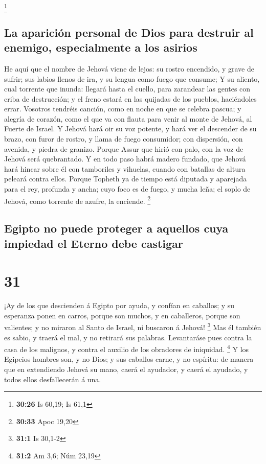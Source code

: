 \footnote{\textbf{30:26} Is 60,19; Is 61,1}

\hypertarget{la-apariciuxf3n-personal-de-dios-para-destruir-al-enemigo-especialmente-a-los-asirios}{%
\subsection{La aparición personal de Dios para destruir al enemigo,
especialmente a los
asirios}\label{la-apariciuxf3n-personal-de-dios-para-destruir-al-enemigo-especialmente-a-los-asirios}}

 He aquí que el nombre de Jehová viene de lejos: su
rostro encendido, y grave de sufrir; sus labios llenos de ira, y su
lengua como fuego que consume;  Y su aliento, cual
torrente que inunda: llegará hasta el cuello, para zarandear las gentes
con criba de destrucción; y el freno estará en las quijadas de los
pueblos, haciéndoles errar.  Vosotros tendréis canción,
como en noche en que se celebra pascua; y alegría de corazón, como el
que va con flauta para venir al monte de Jehová, al Fuerte de Israel.
 Y Jehová hará oir su voz potente, y hará ver el
descender de su brazo, con furor de rostro, y llama de fuego consumidor;
con dispersión, con avenida, y piedra de granizo.  Porque
Assur que hirió con palo, con la voz de Jehová será quebrantado.
 Y en todo paso habrá madero fundado, que Jehová hará
hincar sobre él con tamboriles y vihuelas, cuando con batallas de altura
peleará contra ellos.  Porque Topheth ya de tiempo está
diputada y aparejada para el rey, profunda y ancha; cuyo foco es de
fuego, y mucha leña; el soplo de Jehová, como torrente de azufre, la
enciende. \footnote{\textbf{30:33} Apoc 19,20}

\hypertarget{egipto-no-puede-proteger-a-aquellos-cuya-impiedad-el-eterno-debe-castigar}{%
\subsection{Egipto no puede proteger a aquellos cuya impiedad el Eterno
debe
castigar}\label{egipto-no-puede-proteger-a-aquellos-cuya-impiedad-el-eterno-debe-castigar}}

\hypertarget{section-30}{%
\section{31}\label{section-30}}

 ¡Ay de los que descienden á Egipto por ayuda, y confían
en caballos; y su esperanza ponen en carros, porque son muchos, y en
caballeros, porque son valientes; y no miraron al Santo de Israel, ni
buscaron á Jehová! \footnote{\textbf{31:1} Is 30,1-2}  Mas
él también es sabio, y traerá el mal, y no retirará sus palabras.
Levantaráse pues contra la casa de los malignos, y contra el auxilio de
los obradores de iniquidad. \footnote{\textbf{31:2} Am 3,6; Núm 23,19}
 Y los Egipcios hombres son, y no Dios; y sus caballos
carne, y no espíritu: de manera que en extendiendo Jehová su mano, caerá
el ayudador, y caerá el ayudado, y todos ellos desfallecerán á una.

